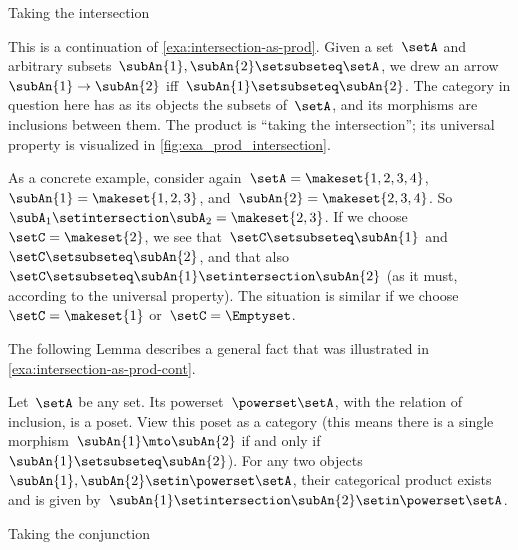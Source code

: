 \begin{marginfigure}
    \centering
    \caption{Taking the intersection}
    \label{fig:exa_prod_intersection_cont}
\end{marginfigure}

\begin{example}
    \label{exa:intersection-as-prod-cont}
    This is a continuation of \cref{exa:intersection-as-prod}.
    Given a set~$\setA$ and arbitrary subsets~$\subAn{1}, \subAn{2} \setsubseteq \setA$, we drew an arrow~$\subAn{1} \to \subAn{2}$ iff~$\subAn{1} \setsubseteq \subAn{2}$.
    The category in question here has as its objects the subsets of~$\setA$, and its morphisms are inclusions between them.
    The product is ``taking the intersection''; its universal property is visualized in \cref{fig:exa_prod_intersection}.

    As a concrete example, consider again~$\setA = \makeset{ 1, 2, 3, 4 }$,~$\subAn{1} = \makeset{ 1, 2, 3 }$, and~$\subAn{2} = \makeset{2, 3, 4 }$.
    So~$\subA_1 \setintersection \subA_2 = \makeset{2, 3 }$.
    If we choose~$\setC = \makeset{ 2 }$, we see that~$\setC \setsubseteq \subAn{1}$ and~$\setC \setsubseteq \subAn{2}$, and that also~$\setC \setsubseteq \subAn{1} \setintersection \subAn{2}$ (as it must, according to the universal property).
    The situation is similar if we choose~$\setC = \makeset{ 1}$ or~$\setC = \Emptyset$.
\end{example}

The following Lemma describes a general fact that was illustrated in \cref{exa:intersection-as-prod-cont}.
\begin{lemma}
    \label{lem:cat-product-powerset}
    Let~$\setA$ be any set.
    Its powerset~$\powerset \setA$, with the relation of inclusion, is a poset.
    View this poset as a category (this means there is a single morphism~$\subAn{1} \mto \subAn{2}$ if and only if~$\subAn{1} \setsubseteq \subAn{2}$).
    For any two objects~$\subAn{1}, \subAn{2} \setin \powerset \setA$, their categorical product exists and is given by~$\subAn{1} \setintersection \subAn{2} \setin \powerset \setA$.
\end{lemma}

\begin{marginfigure}
    \centering
    \caption{Taking the conjunction}
    \label{fig:exa_prod_conjunction_cont}
\end{marginfigure}

